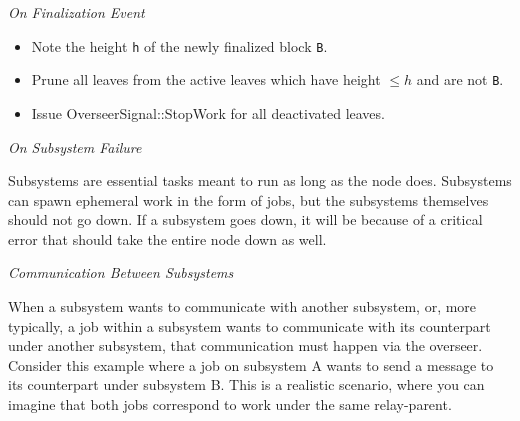 \newline

\textit{On Finalization Event}

\begin{itemize}
    \item Note the height \verb|h| of the newly finalized block \verb|B|.
    \item Prune all leaves from the active leaves which have height $\leq h$
    and are not \verb|B|.
    \item Issue OverseerSignal::StopWork for all deactivated leaves.
\end{itemize}

\textit{On Subsystem Failure}
\newline

Subsystems are essential tasks meant to run as long as the node does. Subsystems
can spawn ephemeral work in the form of jobs, but the subsystems themselves
should not go down. If a subsystem goes down, it will be because of a critical
error that should take the entire node down as well.
\newline

\textit{Communication Between Subsystems}
\newline

When a subsystem wants to communicate with another subsystem, or, more
typically, a job within a subsystem wants to communicate with its counterpart
under another subsystem, that communication must happen via the overseer.
Consider this example where a job on subsystem A wants to send a message to its
counterpart under subsystem B. This is a realistic scenario, where you can
imagine that both jobs correspond to work under the same relay-parent.


